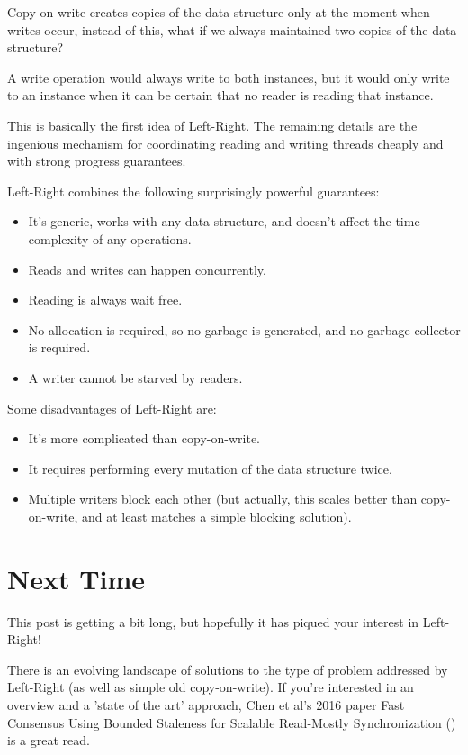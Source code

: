 \documentclass[11pt]{article}
\begin{document}
Copy-on-write creates copies of the data structure only at the moment when writes occur, instead of this, what if we always maintained two copies of the data structure?

A write operation would always write to both instances, but it would only write to an instance when it can be certain that no reader is reading that instance.  

This is basically the first idea of Left-Right. The remaining details are the ingenious mechanism for coordinating reading and writing threads cheaply and with strong progress guarantees.

Left-Right combines the following surprisingly powerful guarantees:

\begin{itemize}
\item It's generic, works with any data structure, and doesn't affect the time complexity of any operations.
\item Reads and writes can happen concurrently.
\item Reading is always wait free.
\item No allocation is required, so no garbage is generated, and no garbage collector is required.
\item A writer cannot be starved by readers.
\end{itemize}

Some disadvantages of Left-Right are:

\begin{itemize}
\item It's more complicated than copy-on-write.
\item It requires performing every mutation of the data structure twice.
\item Multiple writers block each other (but actually, this scales better than copy-on-write, and at least matches a simple blocking solution).
\end{itemize}

\section{Next Time}

This post is getting a bit long, but hopefully it has piqued your interest in Left-Right! 

There is an evolving landscape of solutions to the type of problem addressed by Left-Right (as well as simple old copy-on-write). If you're interested in an overview and a 'state of the art' approach, Chen et al's 2016 paper Fast Consensus Using Bounded Staleness for Scalable Read-Mostly Synchronization (\texttt{}) is a great read.
\end{document}

